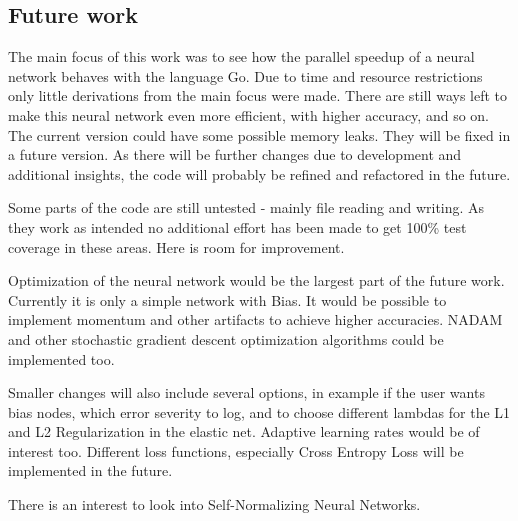 \documentclass[11pt]{article}
\begin{document}
\subsection{Future work}
The main focus of this work was to see how the parallel speedup of a neural network behaves with the language Go. Due to time and resource restrictions only little derivations from the main focus were made. There are still ways left to make this neural network even more efficient, with higher accuracy, and so on. The current version could have some possible memory leaks. They will be fixed in a future version. As there will be further changes due to development and additional insights, the code will probably be refined and refactored in the future.

Some parts of the code are still untested - mainly file reading and writing. As they work as intended no additional effort has been made to get 100\% test coverage in these areas. Here is room for improvement.

Optimization of the neural network would be the largest part of the future work. Currently it is only a simple network with Bias. It would be possible to implement momentum\cite{LeCun2012} and other artifacts to achieve higher accuracies. NADAM and other stochastic gradient descent optimization algorithms\cite{DBLP:journals/corr/Ruder16} could be implemented too.

Smaller changes will also include several options, in example if the user wants bias nodes, which error severity to log, and to choose different lambdas for the L1 and L2 Regularization in the elastic net. Adaptive learning rates\cite{LeCun2012} would be of interest too. Different loss functions, especially Cross Entropy Loss\cite{sadowski2016notes} will be implemented in the future.

There is an interest to look into Self-Normalizing Neural Networks\cite{DBLP:journals/corr/KlambauerUMH17}.
\end{document}
